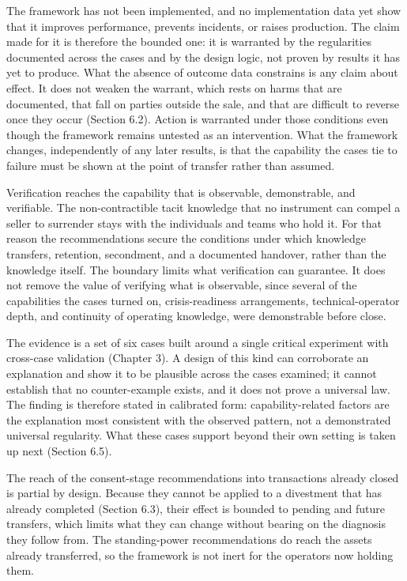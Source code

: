 The framework has not been implemented, and no implementation data yet
show that it improves performance, prevents incidents, or raises
production. The claim made for it is therefore the bounded one: it is
warranted by the regularities documented across the cases and by the
design logic, not proven by results it has yet to produce. What the
absence of outcome data constrains is any claim about effect. It does
not weaken the warrant, which rests on harms that are documented, that
fall on parties outside the sale, and that are difficult to reverse once
they occur (Section 6.2). Action is warranted under those conditions
even though the framework remains untested as an intervention. What the
framework changes, independently of any later results, is that the
capability the cases tie to failure must be shown at the point of
transfer rather than assumed.

Verification reaches the capability that is observable, demonstrable,
and verifiable. The non-contractible tacit knowledge that no instrument
can compel a seller to surrender stays with the individuals and teams
who hold it. For that reason the recommendations secure the conditions
under which knowledge transfers, retention, secondment, and a documented
handover, rather than the knowledge itself. The boundary limits what
verification can guarantee. It does not remove the value of verifying
what is observable, since several of the capabilities the cases turned
on, crisis-readiness arrangements, technical-operator depth, and
continuity of operating knowledge, were demonstrable before close.

The evidence is a set of six cases built around a single critical
experiment with cross-case validation (Chapter 3). A design of this kind
can corroborate an explanation and show it to be plausible across the
cases examined; it cannot establish that no counter-example exists, and
it does not prove a universal law. The finding is therefore stated in
calibrated form: capability-related factors are the explanation most
consistent with the observed pattern, not a demonstrated universal
regularity. What these cases support beyond their own setting is taken
up next (Section 6.5).

The reach of the consent-stage recommendations into transactions already
closed is partial by design. Because they cannot be applied to a
divestment that has already completed (Section 6.3), their effect is
bounded to pending and future transfers, which limits what they can
change without bearing on the diagnosis they follow from. The
standing-power recommendations do reach the assets already transferred,
so the framework is not inert for the operators now holding them.

